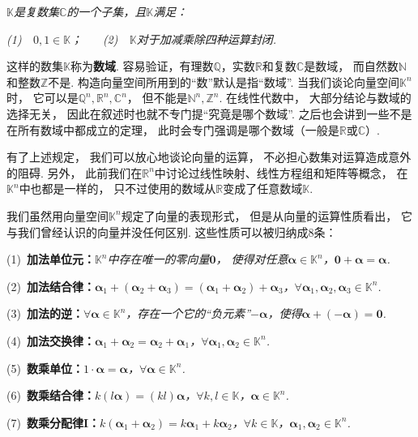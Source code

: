 \textit{$\mathbb{K}$是复数集$\mathbb{C}$的一个子集，且$\mathbb{K}$满足：}

\textit{(1)~~$0,1 \in \mathbb{K}$；}~~~
\textit{(2)~~$\mathbb{K}$对于加减乘除四种运算封闭.}\medskip

这样的数集$\mathbb{K}$称为\textbf{数域}.
容易验证，有理数$\mathbb{Q}$，实数$\mathbb{R}$和复数$\mathbb{C}$是数域，
而自然数$\mathbb{N}$和整数$\mathbb{Z}$不是.
构造向量空间所用到的“数”默认是指“数域”.
当我们谈论向量空间$\mathbb{K}^n$时，
它可以是$\mathbb{Q}^n,\mathbb{R}^n,\mathbb{C}^n$，
但不能是$\mathbb{N}^n,\mathbb{Z}^n$.
在线性代数中，
大部分结论与数域的选择无关，
因此在叙述时也就不专门提“究竟是哪个数域”.
之后也会讲到一些不是在所有数域中都成立的定理，
此时会专门强调是哪个数域（一般是$\mathbb{R}$或$\mathbb{C}$）.




有了上述规定，
我们可以放心地谈论向量的运算，
不必担心数集对运算造成意外的阻碍.
另外，
此前我们在$\mathbb{R}^n$中讨论过线性映射、线性方程组和矩阵等概念，
在$\mathbb{K}^n$中也都是一样的，
只不过使用的数域从$\mathbb{R}$变成了任意数域$\mathbb{K}$.

我们虽然用向量空间$\mathbb{K}^n$规定了向量的表现形式，
但是从向量的运算性质看出，
它与我们曾经认识的向量并没任何区别.
这些性质可以被归纳成$8$条：\medskip

(1)~\textbf{加法单位元：}\textit{$\mathbb{K}^n$中存在唯一的零向量$\bm{0}$，
使得对任意$\bm{\alpha} \in \mathbb{K}^n$，$\bm{0} + \bm{\alpha} = \bm{\alpha}$. }

(2)~\textbf{加法结合律：}\textit{$\bm{\alpha}_1 +( \bm{\alpha}_2 + \bm{\alpha}_3) = (\bm{\alpha}_1 + \bm{\alpha}_2) + \bm{\alpha}_3$，$\forall \bm{\alpha}_1,\bm{\alpha}_2, \bm{\alpha}_3 \in \mathbb{K}^n$.}

(3)~\textbf{加法的逆：}\textit{$\forall \bm{\alpha} \in \mathbb{K}^n$，存在一个它的“负元素”$-\bm{\alpha}$，使得$\bm{\alpha}+(-\bm{\alpha}) = \bm{0}$.}

(4)~\textbf{加法交换律：}\textit{$\bm{\alpha}_1 + \bm{\alpha}_2 = \bm{\alpha}_2 + \bm{\alpha}_1$，$\forall \bm{\alpha}_1,\bm{\alpha}_2 \in \mathbb{K}^n$.}

(5)~\textbf{数乘单位：}\textit{$1 \cdot \bm{\alpha} = \bm{\alpha}$，$\forall \bm{\alpha} \in \mathbb{K}^n$.}

(6)~\textbf{数乘结合律：}\textit{$k(l \bm{\alpha}) = (k l)\bm{\alpha}$，$\forall k,l \in \mathbb{K}$，$\bm{\alpha} \in \mathbb{K}^n$.}

(7)~\textbf{数乘分配律I：}\textit{$k (\bm{\alpha}_1 + \bm{\alpha}_2) = k \bm{\alpha}_1 + k \bm{\alpha}_2$，$\forall k \in \mathbb{K}$，$\bm{\alpha}_1,\bm{\alpha}_2 \in \mathbb{K}^n$.}

